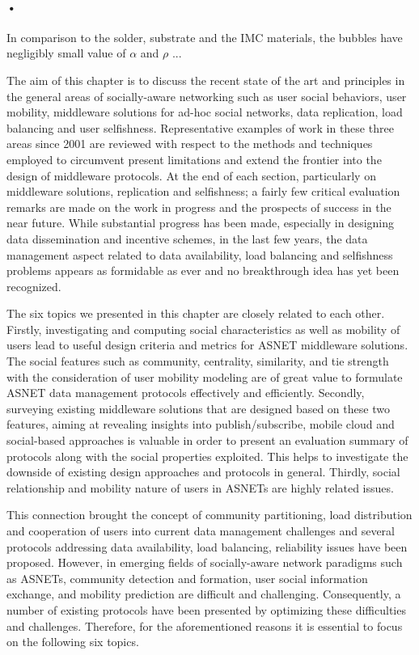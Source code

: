 \paragraph*{•}
In comparison to the solder, substrate and the IMC materials, the bubbles have negligibly small value of $\alpha$ and $\rho$ ...

The aim of this chapter is to discuss the recent state of the art and principles in the general areas of socially-aware networking such as user social behaviors, user mobility, middleware solutions for ad-hoc social networks, data replication, load balancing and user selfishness. Representative examples of work in these three areas since 2001 are reviewed with respect to the methods and techniques employed to circumvent present limitations and extend the frontier into the design of middleware protocols. At the end of each section, particularly on middleware solutions, replication and selfishness; a fairly few critical evaluation remarks are made on the work in progress and the prospects of success in the near future. While substantial progress has been made, especially in designing data dissemination and incentive schemes, in the last few years, the data management aspect related to data availability, load balancing and selfishness problems appears as formidable as ever and no breakthrough idea has yet been recognized.

The six topics we presented in this chapter are closely related to each other. Firstly, investigating and computing social characteristics as well as mobility of users lead to useful design criteria and metrics for ASNET middleware solutions. The social features such as community, centrality, similarity, and tie strength with the consideration of user mobility modeling are of great value to formulate ASNET data management protocols effectively and efficiently. Secondly, surveying existing middleware solutions that are designed based on these two features, aiming at revealing insights into publish/subscribe, mobile cloud and social-based approaches is valuable in order to present an evaluation summary of protocols along with the social properties exploited. This helps to investigate the downside of existing design approaches and protocols in general.  Thirdly, social relationship and mobility nature of users in ASNETs are highly related issues.

This connection brought the concept of community partitioning, load distribution and cooperation of users into current data management challenges and several protocols addressing data availability, load balancing, reliability issues have been proposed.  However, in emerging fields of socially-aware network paradigms such as ASNETs, community detection and formation, user social information exchange, and mobility prediction are difficult and challenging. Consequently, a number of existing protocols have been presented by optimizing these difficulties and challenges. Therefore, for the aforementioned reasons it is essential to focus on the following six topics.

